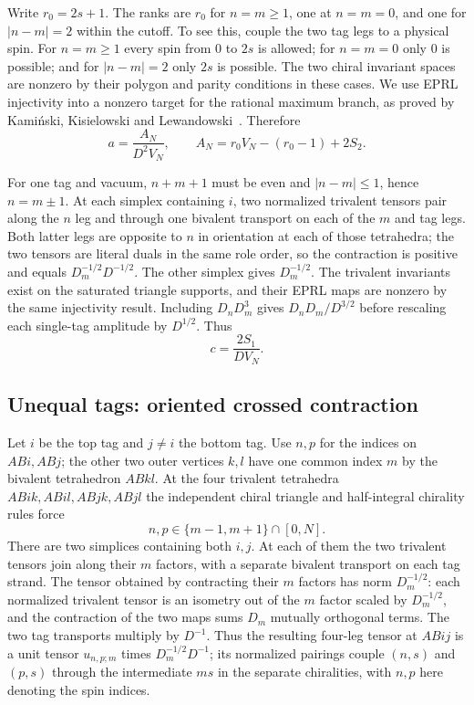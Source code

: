 \documentclass[11pt]{article}
\theoremstyle{remark}
\begin{document}
Write \(r_0=2s+1\). The ranks are \(r_0\) for \(n=m\ge1\), one at \(n=m=0\), and one for \(|n-m|=2\) within the cutoff. To see this, couple the two tag legs to a physical spin. For \(n=m\ge1\) every spin from \(0\) to \(2s\) is allowed; for \(n=m=0\) only \(0\) is possible; and for \(|n-m|=2\) only \(2s\) is possible. The two chiral invariant spaces are nonzero by their polygon and parity conditions in these cases. We use EPRL injectivity into a nonzero target for the rational maximum branch, as proved by Kami\'nski, Kisielowski and Lewandowski~\cite{Injectivity}. Therefore
\begin{equation}\label{eq:a}
 a=\frac{A_N}{D^2V_N},\qquad
 A_N=r_0V_N-(r_0-1)+2S_2 .
\end{equation}

For one tag and vacuum, \(n+m+1\) must be even and \(|n-m|\le1\), hence \(n=m\pm1\). At each simplex containing \(i\), two normalized trivalent tensors pair along the \(n\) leg and through one bivalent transport on each of the \(m\) and tag legs. Both latter legs are opposite to \(n\) in orientation at each of those tetrahedra; the two tensors are literal duals in the same role order, so the contraction is positive and equals \(D_m^{-1/2}D^{-1/2}\). The other simplex gives \(D_m^{-1/2}\). The trivalent invariants exist on the saturated triangle supports, and their EPRL maps are nonzero by the same injectivity result. Including \(D_nD_m^3\) gives \(D_nD_m/D^{3/2}\) before rescaling each single-tag amplitude by \(D^{1/2}\). Thus
\begin{equation}\label{eq:c}
 c=\frac{2S_1}{D V_N}.
\end{equation}

\subsection{Unequal tags: oriented crossed contraction}

Let \(i\) be the top tag and \(j\ne i\) the bottom tag. Use \(n,p\) for the indices on \(ABi,ABj\); the other two outer vertices \(k,l\) have one common index \(m\) by the bivalent tetrahedron \(ABkl\). At the four trivalent tetrahedra \(ABik,ABil,ABjk,ABjl\) the independent chiral triangle and half-integral chirality rules force
\[
 n,p\in \{m-1,m+1\}\cap[0,N].
\]
There are two simplices containing both \(i,j\). At each of them the two trivalent tensors join along their \(m\) factors, with a separate bivalent transport on each tag strand. The tensor obtained by contracting their \(m\) factors has norm \(D_m^{-1/2}\): each normalized trivalent tensor is an isometry out of the \(m\) factor scaled by \(D_m^{-1/2}\), and the contraction of the two maps sums \(D_m\) mutually orthogonal terms. The two tag transports multiply by \(D^{-1}\). Thus the resulting four-leg tensor at \(ABij\) is a unit tensor \(u_{n,p;m}\) times \(D_m^{-1/2}D^{-1}\); its normalized pairings couple \((n,s)\) and \((p,s)\) through the intermediate \(ms\) in the separate chiralities, with \(n,p\) here denoting the spin indices.
\end{document}
